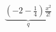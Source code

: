 \documentclass[preview]{standalone}
\begin{document}
\begin{align*}
\underbrace{(-2-\frac{1}{4})\frac{x^2}{2!}}_{q}
\end{align*}
\end{document}

